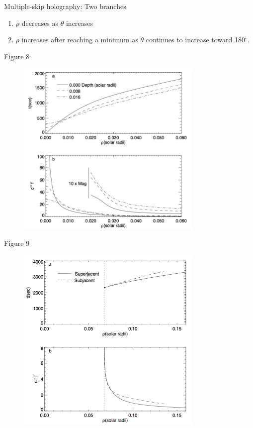 \documentclass{beamer}
\begin{document}
\begin{frame}{8.8}
    Multiple-skip holography: Two branches
    \begin{enumerate}
        \item $\rho$ decreases as $\theta$ increases
        \item $\rho$ increases after reaching a minimum as $\theta$
            continues to increase toward 180$^{\circ}$.
    \end{enumerate}
\end{frame}

\begin{frame}{Figure 8}
    \begin{figure}
        \includegraphics[width=0.8\textwidth]{fig_8.png}
    \end{figure}
\end{frame}

\begin{frame}{Figure 9}
    \begin{figure}
        \includegraphics[width=0.8\textwidth]{fig_9.png}
    \end{figure}
\end{frame}
\end{document}

